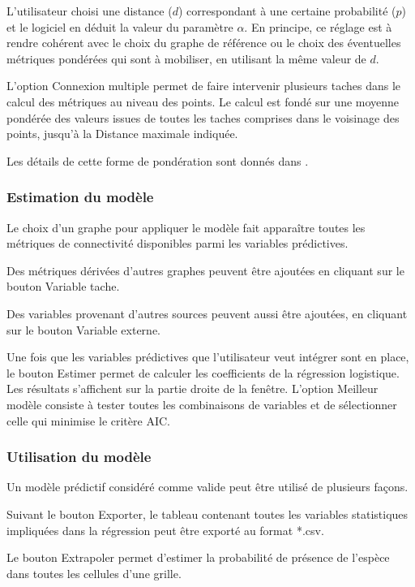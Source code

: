 \documentclass{article}
\begin{document}
L’utilisateur choisi une distance ($d$) correspondant à une certaine probabilité ($p$) et le logiciel en déduit la valeur du paramètre $\alpha $. En principe, ce réglage est à rendre cohérent avec le choix du graphe de référence ou le choix des éventuelles métriques pondérées qui sont à mobiliser, en utilisant la même valeur de $d$.

L’option Connexion multiple permet de faire intervenir plusieurs taches dans le calcul des métriques au niveau des points. Le calcul est fondé sur une moyenne pondérée des valeurs issues de toutes les taches comprises dans le voisinage des points, jusqu’à la Distance maximale indiquée.

Les détails de cette forme de pondération sont donnés dans \cite{2012_SDM}.

\subsubsection{Estimation du modèle}
Le choix d’un graphe pour appliquer le modèle fait apparaître toutes les métriques de connectivité disponibles parmi les variables prédictives.

Des métriques dérivées d’autres graphes peuvent être ajoutées en cliquant sur le bouton Variable tache.

Des variables provenant d’autres sources peuvent aussi être ajoutées, en cliquant sur le bouton Variable externe.

Une fois que les variables prédictives que l’utilisateur veut intégrer sont en place, le bouton Estimer permet de calculer les coefficients de la régression logistique. Les résultats s’affichent sur la partie droite de la fenêtre. L’option Meilleur modèle consiste à tester toutes les combinaisons de variables et de sélectionner celle qui minimise le critère AIC.

\subsubsection{Utilisation du modèle}
Un modèle prédictif considéré comme valide peut être utilisé de plusieurs façons.

Suivant le bouton Exporter, le tableau contenant toutes les variables statistiques impliquées dans la régression peut être exporté au format *.csv.

Le bouton Extrapoler permet d’estimer la probabilité de présence de l’espèce dans toutes les cellules d’une grille. 
\end{document}
